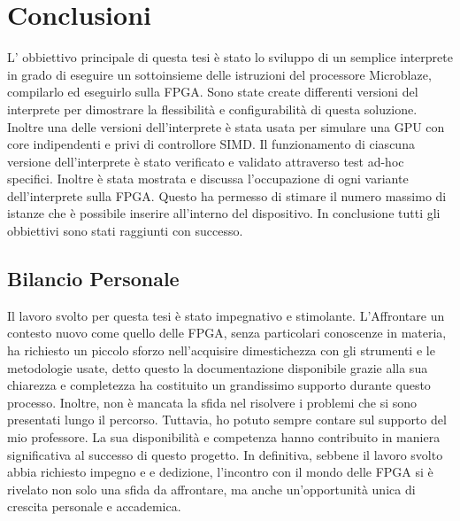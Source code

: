\chapter{Conclusioni}

L' obbiettivo principale di questa tesi è stato lo sviluppo di un semplice interprete in grado di eseguire un sottoinsieme delle istruzioni del processore Microblaze, compilarlo ed eseguirlo sulla FPGA.  Sono state create differenti versioni del interprete per dimostrare la flessibilità e configurabilità di questa soluzione. Inoltre una delle versioni dell'interprete è stata usata per simulare una GPU con core indipendenti e privi di controllore SIMD.
Il funzionamento di ciascuna versione dell'interprete è stato verificato e validato attraverso test ad-hoc specifici.
Inoltre è stata mostrata e discussa l'occupazione di ogni variante dell'interprete sulla FPGA. Questo ha permesso di stimare il numero massimo di istanze che è possibile inserire all'interno del dispositivo.
In conclusione tutti gli obbiettivi sono stati raggiunti con successo.

\section{Bilancio Personale}
Il lavoro svolto per questa tesi è stato impegnativo e stimolante. L'Affrontare un contesto nuovo come quello delle FPGA, senza particolari conoscenze in materia, ha richiesto un piccolo sforzo nell'acquisire dimestichezza con gli strumenti e le metodologie usate, detto questo la documentazione disponibile grazie alla sua chiarezza e completezza ha costituito un grandissimo supporto durante questo processo.  Inoltre, non è mancata la sfida nel risolvere i problemi che si sono presentati lungo il percorso. Tuttavia, ho potuto sempre contare sul supporto del mio professore. La sua disponibilità e competenza hanno contribuito in maniera significativa al successo di questo progetto. In definitiva, sebbene il lavoro svolto abbia richiesto impegno e e dedizione, l'incontro con il mondo delle FPGA si è rivelato non solo una sfida da affrontare, ma anche un'opportunità unica di crescita personale e accademica. 

 
